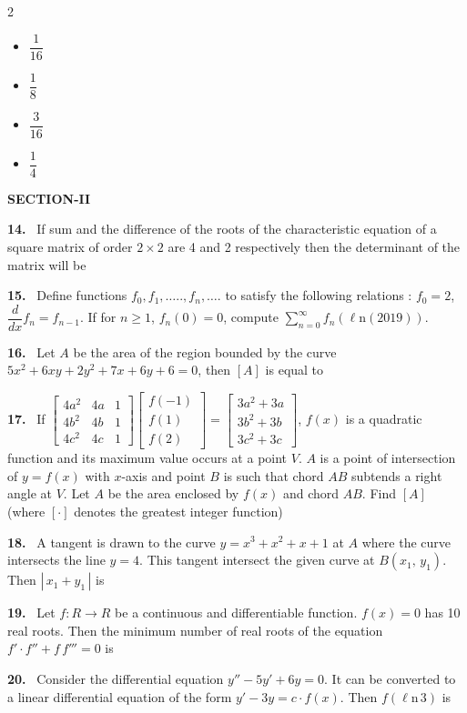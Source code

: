 \documentclass[10pt]{extarticle}
\newcommand{\sect}[1]{\par\smallskip\noindent\textbf{#1}\par}
\newcommand{\qn}[1]{\par\smallskip\noindent\textbf{#1.}~}
\newenvironment{qoptions}{\begin{itemize}[leftmargin=1.8em,itemsep=1pt,topsep=2pt,label={}]}{\end{itemize}}
\newcommand{\opt}[2]{\item[(#1)] #2}
\begin{document}
\begin{multicols}{2}
\begin{qoptions}
\opt{A}{$\dfrac1{16}$}
\opt{B}{$\dfrac18$}
\opt{C}{$\dfrac3{16}$}
\opt{D}{$\dfrac14$}
\end{qoptions}
\sect{SECTION-II}
\qn{14} If sum and the difference of the roots of the characteristic equation of a square matrix of order $2\times2$ are 4 and 2 respectively then the determinant of the matrix will be
\qn{15} Define functions $f_0,f_1,\ldots..,f_n,\ldots.$ to satisfy the following relations : $f_0=2$, $\dfrac{d}{dx}f_n=f_{n-1}$. If for $n\ge1$, $f_n(0)=0$, compute $\displaystyle\sum_{n=0}^{\infty}f_n(\ell\mathrm n(2019))$.
\qn{16} Let $A$ be the area of the region bounded by the curve $5x^2+6xy+2y^2+7x+6y+6=0$, then $[A]$ is equal to
\qn{17} If {\small$\begin{bmatrix}4a^2&4a&1\\4b^2&4b&1\\4c^2&4c&1\end{bmatrix}\begin{bmatrix}f(-1)\\f(1)\\f(2)\end{bmatrix}=\begin{bmatrix}3a^2+3a\\3b^2+3b\\3c^2+3c\end{bmatrix}$}, $f(x)$ is a quadratic function and its maximum value occurs at a point $V$. $A$ is a point of intersection of $y=f(x)$ with $x$-axis and point $B$ is such that chord $AB$ subtends a right angle at $V$. Let $A$ be the area enclosed by $f(x)$ and chord $AB$. Find $[A]$ (where $[\cdot]$ denotes the greatest integer function)
\qn{18} A tangent is drawn to the curve $y=x^3+x^2+x+1$ at $A$ where the curve intersects the line $y=4$. This tangent intersect the given curve at $B(x_1,\,y_1)$. Then $|\,x_1+y_1\,|$ is
\qn{19} Let $f:R\to R$ be a continuous and differentiable function. $f(x)=0$ has 10 real roots. Then the minimum number of real roots of the equation $f'\cdot f''+f\,f'''=0$ is
\qn{20} Consider the differential equation $y''-5y'+6y=0$. It can be converted to a linear differential equation of the form $y'-3y=c\cdot f(x)$. Then $f(\ell\mathrm n\,3)$ is
\end{multicols}
\end{document}
